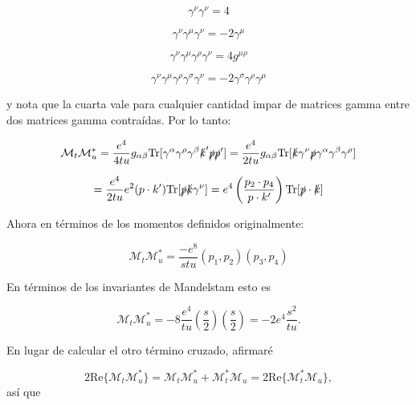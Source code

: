 \begin{equation}
\gamma^\nu \gamma^\nu = 4
\end{equation}

\begin{equation}
\gamma^\nu \gamma^\mu \gamma^\nu = -2\gamma^\mu
\end{equation}

\begin{equation}
\gamma^\nu \gamma^\mu \gamma^\rho \gamma^\nu = 4g^{\mu \rho}
\end{equation}

\begin{equation}
\gamma^\nu \gamma^\mu \gamma^\rho \gamma^\sigma \gamma^\nu = -2\gamma^\sigma \gamma^\rho \gamma^\mu
\end{equation}

y nota que la cuarta vale para cualquier cantidad impar de matrices gamma entre dos matrices gamma contraídas. Por lo tanto:

\begin{equation}
\mathcal{M}_t \mathcal{M}_u^* = \frac{e^4}{4tu} g_{\alpha \beta} \text{Tr}[\gamma^\alpha \gamma^\rho \gamma^\beta \slashed{k}' \slashed{p} \slashed{p}'] = \frac{e^4}{2tu} g_{\alpha \beta} \text{Tr}[\slashed{k} \gamma^\nu \slashed{p} \gamma^\alpha \gamma^\beta \gamma^\rho]
\end{equation}

\begin{equation}
= \frac{e^4}{2tu} e^2 (p \cdot k')\text{Tr}[\slashed{p} \slashed{k} \gamma^\nu] = e^4 \left( \frac{p_2 \cdot p_4}{p\cdot k'} \right) \text{Tr}[\slashed{p} \cdot \slashed{k}]
\end{equation}

Ahora en términos de los momentos definidos originalmente:

\begin{equation}
\mathcal{M}_t \mathcal{M}_u^* = \frac{-e^8}{stu} (p_1, p_2) (p_3, p_4)
\end{equation}

En términos de los invariantes de Mandelstam esto es

\begin{equation}
\mathcal{M}_t \mathcal{M}_u^* = -8 \frac{e^4}{tu} \left( \frac{s}{2} \right) \left( \frac{s}{2} \right) = -2e^4 \frac{s^2}{tu}.
\end{equation}

En lugar de calcular el otro término cruzado, afirmaré

\begin{equation}
2\text{Re}\{\mathcal{M}_t \mathcal{M}_u^*\} = \mathcal{M}_t \mathcal{M}_u^* + \mathcal{M}_t^* \mathcal{M}_u = 2\text{Re}\{\mathcal{M}_t^* \mathcal{M}_u\},
\end{equation}
así que

